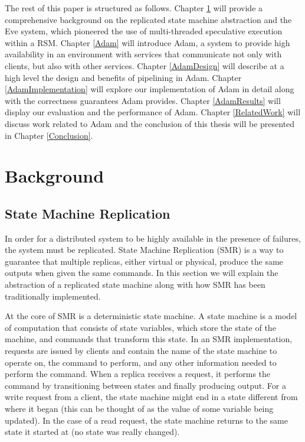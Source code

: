 \documentclass[11pt, oneside]{report}
\begin{document}
The rest of this paper is structured as follows. 
Chapter \ref{Background} will provide a comprehensive background on the replicated state machine abstraction and the Eve system, which pioneered the use of multi-threaded speculative execution within a RSM. 
Chapter \ref{Adam} will introduce Adam, a system to provide high availability in an environment with services that communicate not only with clients, but also with other services. 
Chapter \ref{AdamDesign} will describe at a high level the design and benefits of pipelining in Adam. 
Chapter \ref{AdamImplementation} will explore our implementation of Adam in detail along with the correctness guarantees Adam provides. 
Chapter \ref{AdamResults} will display our evaluation and the performance of Adam. 
Chapter \ref{RelatedWork} will discuss work related to Adam and the conclusion of this thesis will be presented in Chapter \ref{Conclusion}.

\chapter{Background}\label{Background}
\section{State Machine Replication}
In order for a distributed system to be highly available in the presence of failures, the system must be replicated. 
State Machine Replication (SMR) is a way to guarantee that multiple replicas, either virtual or physical, produce the same outputs when given the same commands. 
In this section we will explain the abstraction of a replicated state machine along with how SMR has been traditionally implemented.

At the core of SMR is a deterministic state machine. 
A state machine is a model of computation that consists of state variables, which store the state of the machine, and commands that transform this state. 
In an SMR implementation, requests are issued by clients and contain the name of the state machine to operate on, the command to perform, and any other information needed to perform the command. 
When a replica receives a request, it performs the command by transitioning between states and finally producing output. 
For a write request from a client, the state machine might end in a state different from where it began (this can be thought of as the value of some variable being updated). 
In the case of a read request, the state machine returns to the same state it started at (no state was really changed).
\end{document}
